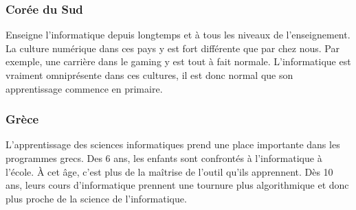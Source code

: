 \subsubsection{Corée du Sud}
Enseigne l'informatique depuis longtemps et à tous les niveaux de l'enseignement. La culture numérique dans ces pays y est fort différente que par chez nous. Par exemple, une carrière dans le gaming y est tout à fait normale. L'informatique est vraiment omniprésente dans ces cultures, il est donc normal que son apprentissage commence en primaire.

\subsubsection{Grèce}
L'apprentissage des sciences informatiques prend une place importante dans les programmes grecs. Des 6 ans, les enfants sont confrontés à l'informatique à l'école. À cet âge, c'est plus de la maîtrise de l'outil qu'ils apprennent. Dès 10 ans, leurs cours d'informatique prennent une tournure plus algorithmique et donc plus proche de la science de l'informatique.
